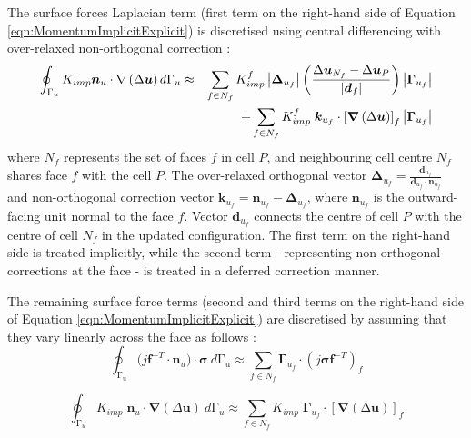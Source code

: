 \documentclass[sn-mathphys,Numbered]{sn-jnl}%
\newcommand{\bb}{\boldsymbol}
\begin{document}
 The surface forces Laplacian term (first term on the right-hand side of Equation \ref{eqn:MomentumImplicitExplicit}) is discretised using central differencing with over-relaxed non-orthogonal correction \cite{demirdzic_finite_1993, jasak_application_2000, cardiff_development_2014, cardiff_large_2014, cardiff_lagrangian_2017}:
\begin{eqnarray} \label{eq:diffusion}
	\oint_{\mathrm{\Gamma}_u}
	K_{imp} \bb{n}_u\cdot\nabla\left(\Delta\bb{u}\right) d\mathrm{\Gamma}_u
	&\approx&
	\sum_{f \in N_f} K_{imp}^f \left|\boldsymbol{\Delta}_{u_f}\right|\left(\frac{\Delta \bb{u}_{N_f} - \Delta \bb{u}_P}{\left|\bb{d}_f\right|}\right)\left|\bb{\Gamma}_{u_f}\right| \notag \\
	    &&+ \sum_{f \in N_f} K_{imp}^f \; \bb{k}_{u_f} \cdot
	    \left[
	    \boldsymbol{\nabla} \left(\mathrm{\Delta}\bb{u}\right)
	    \right]_f
	    \left|\bb{\Gamma}_{u_f}\right|
\end{eqnarray}
where $N_f$ represents the set of faces $f$ in cell $P$, and neighbouring cell centre $N_f$ shares face $f$ with the cell $P$.
The over-relaxed orthogonal vector $\boldsymbol{\Delta}_{u_f} = \frac{\boldsymbol{d}_{u_f}}{\boldsymbol{d}_{u_f} \cdot \boldsymbol{n}_{u_f}}$ and non-orthogonal correction vector $\boldsymbol{k}_{u_f}=\boldsymbol{n}_{u_f}-\boldsymbol{\Delta}_{u_f}$, where $\boldsymbol{n}_{u_f}$ is the outward-facing unit normal to the face $f$.
Vector $\boldsymbol{d}_{u_f}$ connects the centre of cell $P$ with the centre of cell $N_f$ in the updated configuration.
The first term on the right-hand side is treated implicitly, while the second term - representing non-orthogonal corrections at the face - is treated in a deferred correction manner.

 The remaining surface force terms (second and third terms on the right-hand side of Equation \ref{eqn:MomentumImplicitExplicit}) are discretised by assuming that they vary linearly across the face as follows \cite{noauthor_openfoam_2015}:
\begin{equation}
	\oint_{\mathrm{\Gamma_u}}(j\bb{f}^{-T}\cdot{\bb{n}_u)\cdot\boldsymbol{\sigma}}\ d\mathrm{\Gamma_u}
	\approx 
	\sum_{f \in N_f} \bb{\Gamma}_{u_f} \cdot
	\left(j\boldsymbol{\sigma} \bb{f}^{-T}\right)_f
\end{equation}
	
\begin{equation} \label{eq:diffusion_exp}
	    \oint_{\mathrm{\Gamma}_u}{K_{imp} \; \bb{n}_u\cdot \bb{\nabla} \left(\Delta\bb{u}\right)}\ d\mathrm{\Gamma}_u
	\approx
	\sum_{f \in N_f} K_{imp} \; \bb{\Gamma}_{u_f} \cdot \left[\bb{\nabla}\left(\mathrm{\Delta}\bb{u}\right)\right]_f
\end{equation}
\end{document}
